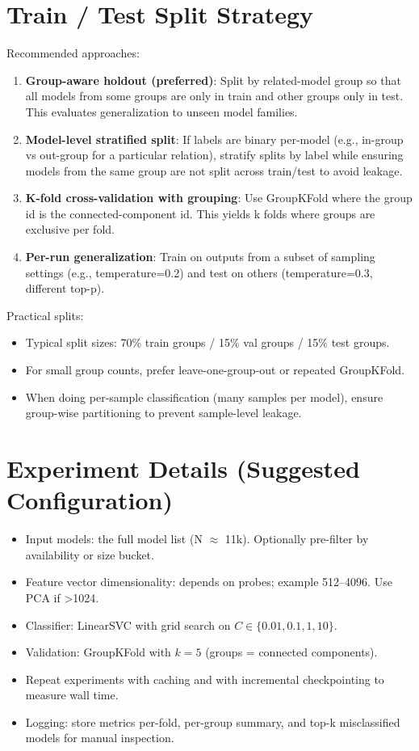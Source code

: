 \documentclass[11pt,a4paper]{article}
\begin{document}
\section{Train / Test Split Strategy}
Recommended approaches:
\begin{enumerate}
  \item \textbf{Group-aware holdout (preferred)}: Split by related-model group so that all models from some groups are only in train and other groups only in test. This evaluates generalization to unseen model families.
  \item \textbf{Model-level stratified split}: If labels are binary per-model (e.g., in-group vs out-group for a particular relation), stratify splits by label while ensuring models from the same group are not split across train/test to avoid leakage.
  \item \textbf{K-fold cross-validation with grouping}: Use GroupKFold where the group id is the connected-component id. This yields k folds where groups are exclusive per fold.
  \item \textbf{Per-run generalization}: Train on outputs from a subset of sampling settings (e.g., temperature=0.2) and test on others (temperature=0.3, different top-p).
\end{enumerate}

Practical splits:
\begin{itemize}
  \item Typical split sizes: 70\% train groups / 15\% val groups / 15\% test groups.
  \item For small group counts, prefer leave-one-group-out or repeated GroupKFold.
  \item When doing per-sample classification (many samples per model), ensure group-wise partitioning to prevent sample-level leakage.
\end{itemize}

\section{Experiment Details (Suggested Configuration)}
\begin{itemize}
  \item Input models: the full model list (N $\approx$ 11k). Optionally pre-filter by availability or size bucket.
  \item Feature vector dimensionality: depends on probes; example 512--4096. Use PCA if >1024.
  \item Classifier: LinearSVC with grid search on $C \in \{0.01,0.1,1,10\}$.
  \item Validation: GroupKFold with $k=5$ (groups = connected components).
  \item Repeat experiments with caching and with incremental checkpointing to measure wall time.
  \item Logging: store metrics per-fold, per-group summary, and top-k misclassified models for manual inspection.
\end{itemize}
\end{document}

